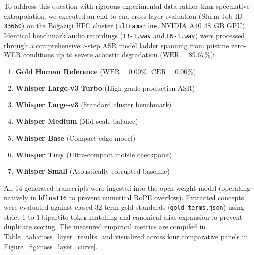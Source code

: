 \documentclass[a4paper,12pt]{report}
\begin{document}
To address this question with rigorous experimental data rather than speculative extrapolation, we executed an end-to-end cross-layer evaluation (Slurm Job ID \texttt{33660}) on the Bo\u{g}azi\c{c}i HPC cluster (\texttt{ultramarine}, NVIDIA A40 48~GB GPU). Identical benchmark audio recordings (\texttt{TR-1.wav} and \texttt{EN-1.wav}) were processed through a comprehensive 7-step ASR model ladder spanning from pristine zero-WER conditions up to severe acoustic degradation ($\text{WER} = 89.67\%$):
\begin{enumerate}
    \item \textbf{Gold Human Reference} ($\text{WER} = 0.00\%$, $\text{CER} = 0.00\%$)
    \item \textbf{Whisper Large-v3 Turbo} (High-grade production ASR)
    \item \textbf{Whisper Large-v3} (Standard cluster benchmark)
    \item \textbf{Whisper Medium} (Mid-scale balance)
    \item \textbf{Whisper Base} (Compact edge model)
    \item \textbf{Whisper Tiny} (Ultra-compact mobile checkpoint)
    \item \textbf{Whisper Small} (Acoustically corrupted baseline)
\end{enumerate}

All 14 generated transcripts were ingested into the open-weight  model (operating natively in \texttt{bfloat16} to prevent numerical RoPE overflow). Extracted concepts were evaluated against closed 32-term gold standards (\texttt{gold\_terms.json}) using strict 1-to-1 bipartite token matching and canonical alias expansion to prevent duplicate scoring. The measured empirical metrics are compiled in Table~\ref{tab:cross_layer_results} and visualized across four comparative panels in Figure~\ref{fig:cross_layer_curve}.
\end{document}
